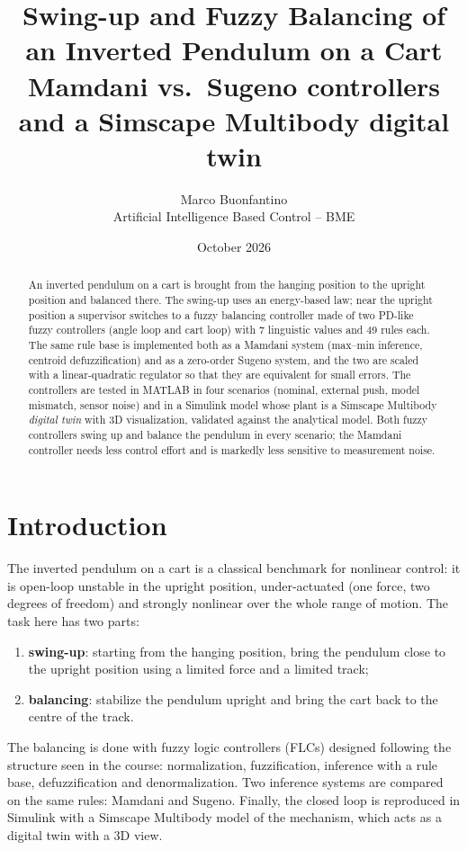\documentclass[11pt,a4paper]{article}
\title{\textbf{Swing-up and Fuzzy Balancing of an Inverted Pendulum on a Cart}\\[4pt]
\large Mamdani vs.\ Sugeno controllers and a Simscape Multibody digital twin}
\author{Marco Buonfantino\\ \small Artificial Intelligence Based Control -- BME}
\date{October 2026}
\begin{document}
\maketitle

\begin{abstract}
An inverted pendulum on a cart is brought from the hanging position to the upright position and balanced there. The swing-up uses an energy-based law; near the upright position a supervisor switches to a fuzzy balancing controller made of two PD-like fuzzy controllers (angle loop and cart loop) with 7 linguistic values and 49 rules each. The same rule base is implemented both as a Mamdani system (max--min inference, centroid defuzzification) and as a zero-order Sugeno system, and the two are scaled with a linear-quadratic regulator so that they are equivalent for small errors. The controllers are tested in MATLAB in four scenarios (nominal, external push, model mismatch, sensor noise) and in a Simulink model whose plant is a Simscape Multibody \emph{digital twin} with 3D visualization, validated against the analytical model. Both fuzzy controllers swing up and balance the pendulum in every scenario; the Mamdani controller needs less control effort and is markedly less sensitive to measurement noise.
\end{abstract}

\section{Introduction}
The inverted pendulum on a cart is a classical benchmark for nonlinear control: it is open-loop unstable in the upright position, under-actuated (one force, two degrees of freedom) and strongly nonlinear over the whole range of motion. The task here has two parts:
\begin{enumerate}
  \item \textbf{swing-up}: starting from the hanging position, bring the pendulum close to the upright position using a limited force and a limited track;
  \item \textbf{balancing}: stabilize the pendulum upright and bring the cart back to the centre of the track.
\end{enumerate}
The balancing is done with fuzzy logic controllers (FLCs) designed following the structure seen in the course: normalization, fuzzification, inference with a rule base, defuzzification and denormalization. Two inference systems are compared on the same rules: Mamdani and Sugeno. Finally, the closed loop is reproduced in Simulink with a Simscape Multibody model of the mechanism, which acts as a digital twin with a 3D view.
\end{document}
